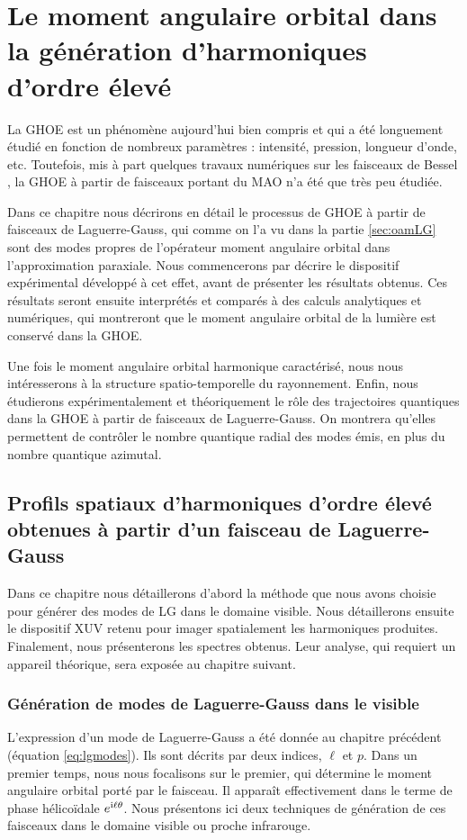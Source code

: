 \part{Le moment angulaire orbital dans la génération d'harmoniques d'ordre élevé}
\label{PA:OAM_HHG}
La GHOE est un phénomène aujourd'hui bien compris et qui a été longuement étudié en fonction de nombreux paramètres : intensité, pression, longueur d'onde, etc. Toutefois, mis à part quelques travaux numériques sur les faisceaux de Bessel , la GHOE à partir de faisceaux portant du MAO n'a été que très peu étudiée. 

Dans ce chapitre nous décrirons en détail le processus de GHOE à partir de faisceaux de Laguerre-Gauss, qui comme on l'a vu dans la partie \ref{sec:oamLG} sont des modes propres de l'opérateur moment angulaire orbital dans l'approximation paraxiale. Nous commencerons par décrire le dispositif expérimental développé à cet effet, avant de présenter les résultats obtenus. Ces résultats seront ensuite interprétés et comparés à des calculs analytiques et numériques, qui montreront que le moment angulaire orbital de la lumière est conservé dans la GHOE.

Une fois le moment angulaire orbital harmonique caractérisé, nous nous intéresserons à la structure spatio-temporelle du rayonnement. Enfin, nous étudierons expérimentalement et théoriquement le rôle des trajectoires quantiques dans la GHOE à partir de faisceaux de Laguerre-Gauss. On montrera qu'elles permettent de contrôler le nombre quantique radial des modes émis, en plus du nombre quantique azimutal. 
\newpage

\chapter{Profils spatiaux d'harmoniques d'ordre élevé obtenues à partir d'un faisceau de Laguerre-Gauss}
Dans ce chapitre nous détaillerons d'abord la méthode que nous avons choisie pour générer des modes de LG dans le domaine visible. Nous détaillerons ensuite le dispositif XUV retenu pour imager spatialement les harmoniques produites. Finalement, nous présenterons les spectres obtenus. Leur analyse, qui requiert un appareil théorique, sera exposée au chapitre suivant.

\section{Génération de modes de Laguerre-Gauss dans le visible}
L'expression d'un mode de Laguerre-Gauss a été donnée au chapitre précédent (équation \ref{eq:lgmodes}). Ils sont décrits par deux indices, $\ell$ et $p$. Dans un premier temps, nous nous focalisons sur le premier, qui détermine le moment angulaire orbital porté par le faisceau. Il apparaît effectivement dans le terme de phase hélicoïdale $e^{\mathrm{i}\ell\theta}$. Nous présentons ici deux techniques de génération de ces faisceaux dans le domaine visible ou proche infrarouge.

